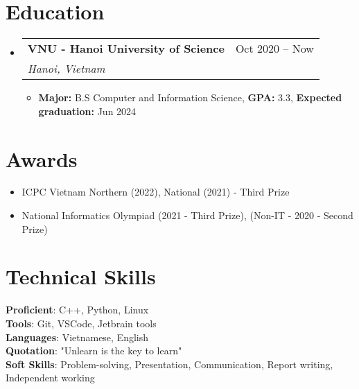 \documentclass[letterpaper,11pt]{article}
\makeatletter
\newcommand{\resumeItem}[1]{
  \item{
    {#1 \vspace{-1.5pt}}
  }
}
\newcommand{\resumeSubheading}[4]{
  \vspace{-2pt}\item
    \begin{tabular*}{0.97\textwidth}[t]{l@{\extracolsep{\fill}}l}
      \textbf{#1} & #2 \\
      \textit{\small#3} & \textit{\small #4} \\
    \end{tabular*}\vspace{-8pt}
}
\newcommand{\resumeSubHeadingListStart}{\begin{itemize}[leftmargin=0.1in, label={}]}
\newcommand{\resumeSubHeadingListEnd}{\end{itemize}}
\newcommand{\resumeItemListStart}{\begin{itemize}[leftmargin=0.2in]}
\newcommand{\resumeItemListEnd}{\end{itemize}\vspace{-2pt}}
\makeatother
\begin{document}
\section{Education}
  \resumeSubHeadingListStart
    \resumeSubheading
      {VNU - Hanoi University of Science}{Oct 2020 – Now}
      {Hanoi, Vietnam}{}
          \resumeItemListStart
            \resumeItem{\textbf{Major:} B.S Computer and Information Science, \textbf{GPA:} 3.3, \textbf{Expected graduation:} Jun 2024}
        \resumeItemListEnd

  \resumeSubHeadingListEnd


      
    


\section{Awards}

    \begin{itemize}
        \item ICPC Vietnam Northern (2022), National (2021) - Third Prize
        \item National Informatics Olympiad (2021 - Third Prize), (Non-IT - 2020 - Second Prize)
    \end{itemize}


%
\section{Technical Skills}
 \begin{itemize}[leftmargin=0.15in, label={}]
    \small{\item{
     \textbf{Proficient}{: C++, Python, Linux} \\
     \textbf{Tools}{: Git, VSCode, Jetbrain tools} \\
     \textbf{Languages}{: Vietnamese, English} \\
    \textbf{Quotation}{: "Unlearn is the key to learn"}\\
    \textbf{Soft Skills}{: Problem-solving, Presentation, Communication, Report writing, Independent working} \\
    }}
 \end{itemize}

\end{document}
